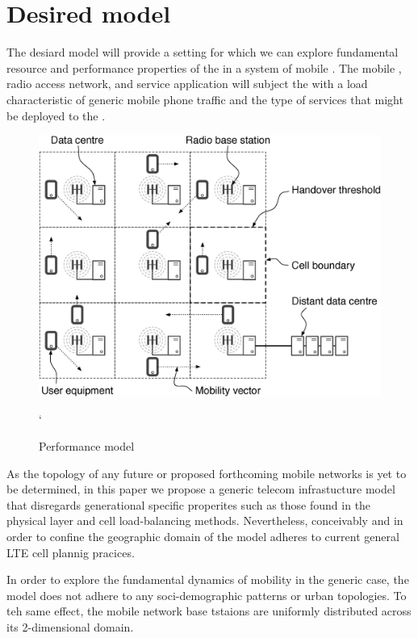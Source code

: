 \section{Desired model}

The desiard model will provide a setting for which we can explore fundamental resource and performance properties of the \xcloud in a system of mobile \ues. The mobile \ues, radio access network, and service application will subject the \dcs with a load characteristic of generic mobile phone traffic and the type of services that might be deployed to the \xcloud.

\begin{figure}[tb]
	\centering
	\includegraphics[width=\linewidth]{desiard_model.eps} 
	\caption{Performance model}
	\label{fig:performance_model}`
\end{figure}

As the topology of any future \xcloud or proposed forthcoming mobile networks is yet to be determined, in this paper we propose a generic telecom infrastucture model that disregards generational specific properites such as those found in the physical layer and cell load-balancing methods. Nevertheless, conceivably and in order to confine the geographic domain of the model adheres to current general LTE cell plannig pracices. 

In order to explore the fundamental dynamics of mobility in the generic case, the model does not adhere to any soci-demographic patterns or urban topologies. To teh same effect, the mobile network base tstaions are  uniformly distributed across its 2-dimensional domain.

